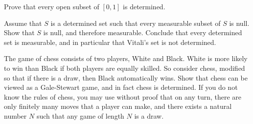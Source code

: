 \begin{exercise}
Prove that every open subset of $[0, 1]$ is determined.
\end{exercise}

\begin{exercise}
Assume that $S$ is a determined set such that every measurable subset of $S$ is null.
Show that $S$ is null, and therefore measurable.
Conclude that every determined set is measurable, and in particular that Vitali's set is not determined.
\end{exercise}

\begin{exercise}[Zermelo]
The game of chess consists of two players, White and Black.
White is more likely to win than Black if both players are equally skilled.
So consider chess, modified so that if there is a draw, then Black automatically wins.
Show that chess can be viewed as a Gale-Stewart game, and in fact chess is determined.
If you do not know the rules of chess, you may use without proof that on any turn, there are only finitely many moves that a player can make, and there exists a natural number $N$ such that any game of length $N$ is a draw.
\end{exercise}
